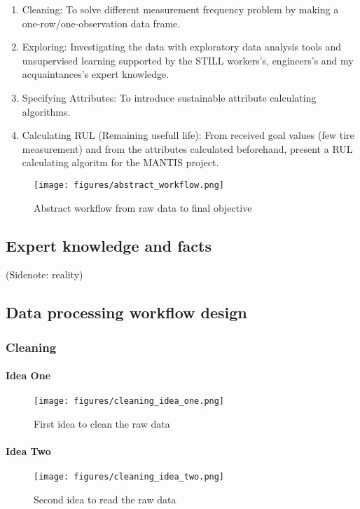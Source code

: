\begin{enumerate}
	\item {Cleaning:} To solve different measurement frequency problem by making a one-row/one-observation data frame.
	\item {Exploring:} Investigating the data with exploratory data analysis tools and unsupervised learning supported by the STILL workers's, engineers's and my acquaintances's expert knowledge.
 	\item {Specifying Attributes:} To introduce sustainable attribute calculating algorithms.
 	\item {Calculating RUL (Remaining usefull life):} From received goal values (few tire measurement) and from the attributes calculated beforehand, present a RUL calculating algoritm for the MANTIS project.
\end{enumerate}

\begin{figure}[!ht]
\centering
\texttt{[image: figures/abstract\_workflow.png]}
\caption{Abstract workflow from raw data to final objective} 
\end{figure}

\subsection{Expert knowledge and facts}
(Sidenote: reality)
\subsection{Data processing workflow design}
	\subsubsection{Cleaning}
		\paragraph{Idea One}
\begin{figure}[!ht]
\centering
\texttt{[image: figures/cleaning\_idea\_one.png]}
\caption{First idea to clean the raw data} 
\end{figure}
		\paragraph{Idea Two}
\begin{figure}[!ht]
\centering
\texttt{[image: figures/cleaning\_idea\_two.png]}
\caption{Second idea to read the raw data} 
\end{figure}
